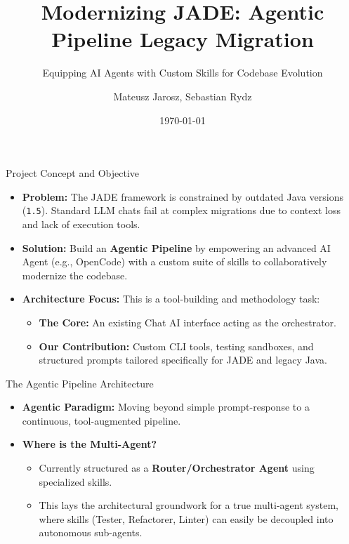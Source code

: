 \documentclass[aspectratio=169]{beamer}
\title{Modernizing JADE: Agentic Pipeline Legacy Migration}
\subtitle{Equipping AI Agents with Custom Skills for Codebase Evolution}
\author{Mateusz Jarosz, Sebastian Rydz}
\institute{Warsaw University of Technology}
\date{\today}
\begin{document}
\begin{frame}
  \titlepage
\end{frame}

\begin{frame}{Project Concept and Objective}
\begin{itemize}
  \item \textbf{Problem:} The JADE framework is constrained by outdated Java versions (\texttt{1.5}). Standard LLM chats fail at complex migrations due to context loss and lack of execution tools.
  \item \textbf{Solution:} Build an \textbf{Agentic Pipeline} by empowering an advanced AI Agent (e.g., OpenCode) with a custom suite of skills to collaboratively modernize the codebase.
  \item \textbf{Architecture Focus:} This is a tool-building and methodology task:
  \begin{itemize}
    \item \textbf{The Core:} An existing Chat AI interface acting as the orchestrator.
    \item \textbf{Our Contribution:} Custom CLI tools, testing sandboxes, and structured prompts tailored specifically for JADE and legacy Java.
  \end{itemize}
\end{itemize}
\end{frame}

\begin{frame}{The Agentic Pipeline Architecture}
\begin{itemize}
  \item \textbf{Agentic Paradigm:} Moving beyond simple prompt-response to a continuous, tool-augmented pipeline. 
  \item \textbf{Where is the Multi-Agent?} 
  \begin{itemize}
      \item Currently structured as a \textbf{Router/Orchestrator Agent} using specialized skills.
      \item This lays the architectural groundwork for a true multi-agent system, where skills (Tester, Refactorer, Linter) can easily be decoupled into autonomous sub-agents.
  \end{itemize}
\end{itemize}
\end{frame}
\end{document}
